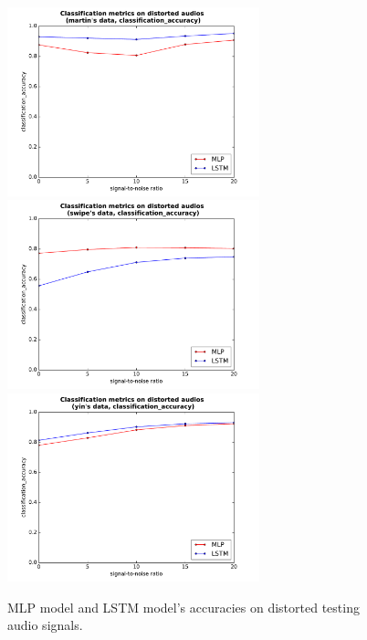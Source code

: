 \documentclass[11pt,a4paper]{report}
\begin{document}
\begin{figure}[htbp]
  \centering
  \includegraphics[width=0.65\textwidth]{classification_metrics_whole_martin_classification_accuracy.pdf}
  \includegraphics[width=0.65\textwidth]{classification_metrics_whole_swipe_classification_accuracy.pdf}
  \includegraphics[width=0.65\textwidth]{classification_metrics_whole_yin_classification_accuracy.pdf}
  \caption{MLP model and LSTM model's accuracies on distorted testing audio signals.}
  \label{fig:distorted-testing-data-accuracy-whole}
\end{figure}
\end{document}
